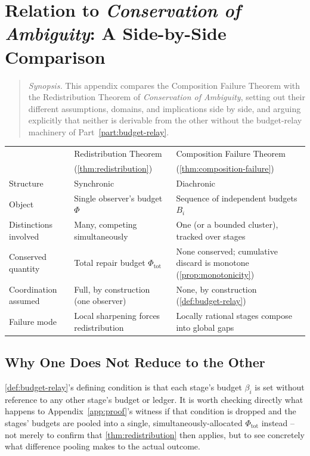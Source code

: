 \chapter{Relation to \emph{Conservation of Ambiguity}: A Side-by-Side Comparison}
\label{app:comparison}

\begin{quotation}
\noindent\textit{Synopsis.} This appendix compares the Composition Failure
Theorem with the Redistribution Theorem of \emph{Conservation of
Ambiguity}, setting out their different assumptions, domains, and
implications side by side, and arguing explicitly that neither is derivable
from the other without the budget-relay machinery of
Part~\ref{part:budget-relay}.
\end{quotation}


\begin{center}
\small
\begin{tabular}{p{2.3cm}p{3.6cm}p{3.6cm}}
\toprule
& Redistribution Theorem & Composition Failure Theorem \\
& (\cref{thm:redistribution}) & (\cref{thm:composition-failure}) \\
\midrule
Structure & Synchronic & Diachronic \\
Object & Single observer's budget $\Phi$ & Sequence of independent budgets $B_i$ \\
Distinctions involved & Many, competing simultaneously & One (or a bounded cluster), tracked over stages \\
Conserved quantity & Total repair budget $\Phi_{\mathrm{tot}}$ & None conserved; cumulative discard is monotone (\cref{prop:monotonicity}) \\
Coordination assumed & Full, by construction (one observer) & None, by construction (\cref{def:budget-relay}) \\
Failure mode & Local sharpening forces redistribution & Locally rational stages compose into global gaps \\
\bottomrule
\end{tabular}
\end{center}

\section{Why One Does Not Reduce to the Other}

\cref{def:budget-relay}'s defining condition is that each stage's budget
$\beta_i$ is set without reference to any other stage's budget or ledger.
It is worth checking directly what happens to
Appendix~\ref{app:proof}'s witness if that condition is dropped and the
stages' budgets are pooled into a single, simultaneously-allocated
$\Phi_{\mathrm{tot}}$ instead -- not merely to confirm that
\cref{thm:redistribution} then applies, but to see concretely what
difference pooling makes to the actual outcome.

